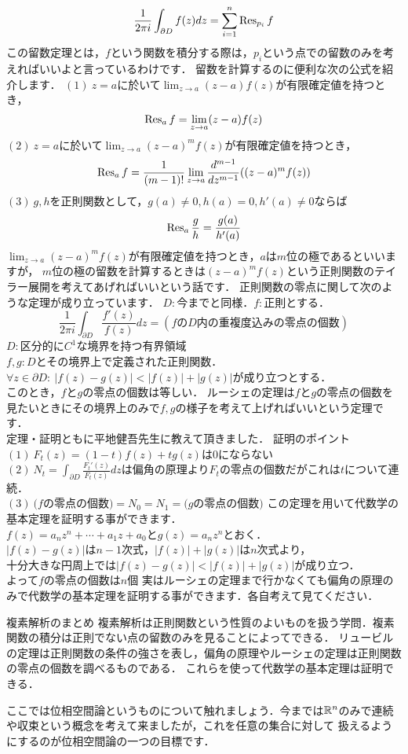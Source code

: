 \[
\frac{1}{2 \pi i}\int_{\partial D} f(z)dz = \sum_{i=1}^n \mathop{\mathrm{Res}}\nolimits_{p_i} f
\]
\thmx
この留数定理とは，$f$という関数を積分する際は，$p_i$という点での留数のみを考えればいいよと言っているわけです．
留数を計算するのに便利な次の公式を紹介します．
\prop
$(1)\ z=a$に於いて$\lim_{z\to a} (z-a)f(z)$が有限確定値を持つとき，
\[
\mathop{\mathrm{Res}}\nolimits_{a} f = \lim_{z\to a} (z-a)f(z)
\]
$(2)\ z=a$に於いて$\lim_{z\to a} (z-a)^m f(z)$が有限確定値を持つとき，
\[
\mathop{\mathrm{Res}}\nolimits_{a} f = \frac{1}{(m-1)!} \lim_{z\to a} \frac{d^{m-1}}{dz^{m-1}} ((z-a)^mf(z))
\]
$(3)\ g,h$を正則関数として，$g(a)\neq 0,h(a)=0,h'(a)\neq 0$ならば
\[
\mathop{\mathrm{Res}}\nolimits_{a} \frac{g}{h} = \frac{g(a)}{h'(a)}
\]
\propx
$\lim_{z\to a} (z-a)^m f(z)$が有限確定値を持つとき，$a$は$m$位の極であるといいますが，
$m$位の極の留数を計算するときは$(z-a)^m f(z)$という正則関数のテイラー展開を考えてあげればいいという話です．
正則関数の零点に関して次のような定理が成り立っています．
\thm[偏角の原理]
$D:$今までと同様．$f:$正則とする．
\[
\frac{1}{2 \pi i} \int_{\partial D} \frac{f'(z)}{f(z)}dz = (f\mbox{の}D\mbox{内の重複度込みの零点の個数})
\]
\thmx
\thm[ルーシェの定理]
$D:$区分的に$C^1$な境界を持つ有界領域\\
$f,g:D$とその境界上で定義された正則関数．\\
$\forall z \in \partial D :\ |f(z)-g(z)|<|f(z)|+|g(z)|$が成り立つとする．\\
このとき，$f$と$g$の零点の個数は等しい．
\thmx
ルーシェの定理は$f$と$g$の零点の個数を見たいときにその境界上のみで$f,g$の様子を考えて上げればいいという定理です．
\proof
\leavevmode\\
定理・証明ともに平地健吾先生に教えて頂きました．
証明のポイント\\
$(1)\ F_t(z) = (1-t) f(z) + t g(z)$は$0$にならない\\
$(2)\ N_t=\int_{\partial D} \frac{F_t'(z)}{F_t(z)}dz$は偏角の原理より$F_t$の零点の個数だがこれは$t$について連続．\\
$(3)\ (f$の零点の個数$)=N_0=N_1=(g$の零点の個数$)$
\proofx
この定理を用いて代数学の基本定理を証明する事ができます．
\proof[ルーシェの定理を用いた代数学の基本定理の証明]
\leavevmode\\

$f(z)=a_n z^n + \cdots + a_1 z+ a_0$と$g(z)=a_n z^n$とおく．\\
$|f(z)-g(z)|$は$n-1$次式，$|f(z)|+|g(z)|$は$n$次式より，\\
十分大きな円周上では$|f(z)-g(z)|<|f(z)|+|g(z)|$が成り立つ．\\
よって$f$の零点の個数は$n$個
\proofx
\prob
実はルーシェの定理まで行かなくても偏角の原理のみで代数学の基本定理を証明する事ができます．各自考えて見てください．
\probx
\begin{itembox}[l]{複素解析のまとめ}
複素解析は正則関数という性質のよいものを扱う学問．複素関数の積分は正則でない点の留数のみを見ることによってできる．
リュービルの定理は正則関数の条件の強さを表し，偏角の原理やルーシェの定理は正則関数の零点の個数を調べるものである．
これらを使って代数学の基本定理は証明できる．
\end{itembox}
ここでは位相空間論というものについて触れましょう．今までは$\mathbb R^n$のみで連続や収束という概念を考えて来ましたが，これを任意の集合に対して
扱えるようにするのが位相空間論の一つの目標です．


